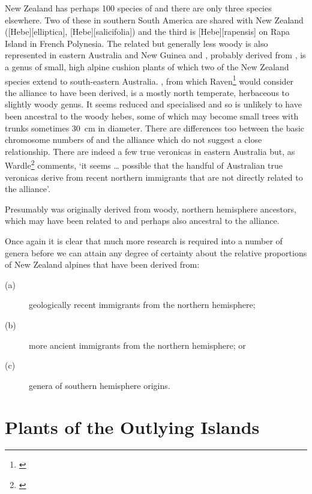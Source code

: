 New Zealand has perhaps 100 species of  and there are only three species elsewhere.
Two of these in southern South America are shared with New Zealand ([Hebe][elliptica], [Hebe][salicifolia]) and the third is [Hebe][rapensis] on Rapa Island in French Polynesia.
The related but generally less woody  is also represented in eastern Australia and New Guinea and , probably derived from , is a genus of small, high alpine cushion plants of which two of the New Zealand species extend to south-eastern Australia. , from which Raven\footnote{\cite{raven1973evolution}} would consider the  alliance to have been derived, is a mostly north temperate, herbaceous to slightly woody genus.
It seems reduced and specialised and so is unlikely to have been ancestral to the woody hebes, some of which may become small trees with trunks sometimes \SI{30}{\centi\metre} in diameter.
There are differences too between the basic chromosome numbers of  and the  alliance which do not suggest a close relationship.
There are indeed a few true veronicas in eastern Australia but, as Wardle\footnote{\cite{wardle1978origin}} comments, `it seems … possible that the handful of Australian true veronicas derive from recent northern immigrants that are not directly related to the  alliance'.

Presumably  was originally derived from woody, northern hemisphere ancestors, which may have been related to and perhaps also ancestral to the  alliance.

Once again it is clear that much more research is required into a number of genera before we can attain any degree of certainty about the relative proportions of New Zealand alpines that have been derived from:

\begin{description}
\item[{(a)}]geologically recent immigrants from the northern hemisphere;
\item[{(b)}]more ancient immigrants from the northern hemisphere; or
\item[{(c)}]genera of southern hemisphere origins.
\end{description}

\chapter{Plants of the Outlying Islands}

